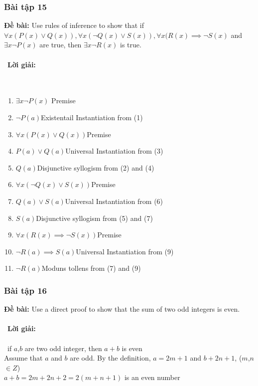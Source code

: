 \documentclass[a4paper]{article}
\begin{document}
\subsubsection{Bài tập 15} 
\textbf{Đề bài:} Use rules of inference to show that if $\forall x (P(x) \lor Q(x)), \forall x(\lnot Q(x) \lor S(x)), \forall x(R(x) \implies \lnot S(x)$ and $\exists x \lnot P(x) $ are true, then $\exists x \lnot R(x)$ is true.
\\\ \\\
\textbf{Lời giải:} \\\ \\\
\begin{enumerate}
		\item $\exists x \lnot P(x)$ \hfill Premise\\
		\item $\lnot P(a)$\hfill Existentail Instantiation from (1)\\
		\item $ \forall x (P(x) \lor Q(x))$\hfill Premise\\
		\item $ P(a) \lor Q(a)$\hfill Universal Instantiation from (3)\\
		\item $ Q(a)$\hfill Disjunctive syllogism from (2) and (4)\\
		\item $\forall x (\lnot Q(x) \lor S(x))$\hfill Premise\\
		\item $ Q(a) \lor S(a)$\hfill Universal Instantiation from (6)\\
		\item $ S(a)$\hfill Disjunctive syllogism from (5) and (7)\\
		\item $ \forall x (R(x) \implies \lnot S(x))$\hfill Premise \\
		\item $ \lnot R(a) \implies S(a)$\hfill Universal Instantiation from (9)\\
		\item $ \lnot R(a)$\hfill Moduns tollens from (7) and (9)\\
	\end{enumerate}
\clearpage
\subsubsection{Bài tập 16}
\textbf{Đề bài:} Use a direct proof to show that the sum of two odd integers is even.
\\\ \\\
\textbf{Lời giải:} \\\ \\\
	if $a$,$b$ are two odd integer, then $a+b$ is even\\
		Assume that $a$ and $b$ are odd. By the definition, $a=2m+1$ and $b+2n+1$, ($m$,$n$ $\in Z$)\\
		$a+b=2m+2n+2=2(m+n+1)$ is an even number\\
\clearpage
\end{document}
